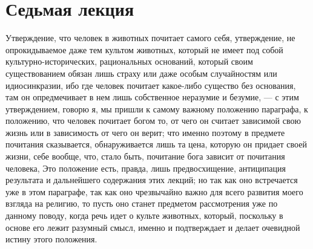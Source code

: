 \documentclass[12pt]{article}
\begin{document}
{}
\section*{Седьмая лекция}

Утверждение, что человек в животных почитает самого себя, утверждение, не опрокидываемое даже тем культом животных, который не имеет под собой культурно-исторических, рациональных оснований, который своим существованием обязан лишь страху или даже особым случайностям или идиосинкразии, ибо где человек почитает какое-либо существо без основания, там он опредмечивает в нем лишь собственное неразумие и безумие, --- с этим утверждением, говорю я, мы пришли к самому важному положению параграфа, к положению, что человек почитает богом то, от чего он считает зависимой свою жизнь или в зависимость от чего он верит; что именно поэтому в предмете почитания сказывается, обнаруживается лишь та цена, которую он придает своей жизни, себе вообще, что, стало быть, почитание бога зависит от почитания человека, Это положение есть, правда, лишь предвосхищение, антиципация результата и дальнейшего содержания этих лекций; но так как оно встречается уже в этом параграфе, так как оно чрезвычайно важно для всего развития моего взгляда на религию, то пусть оно станет предметом рассмотрения уже по данному поводу, когда речь идет о культе животных, который, поскольку в основе его лежит разумный смысл, именно и подтверждает и делает очевидной истину этого положения. 
\end{document}
